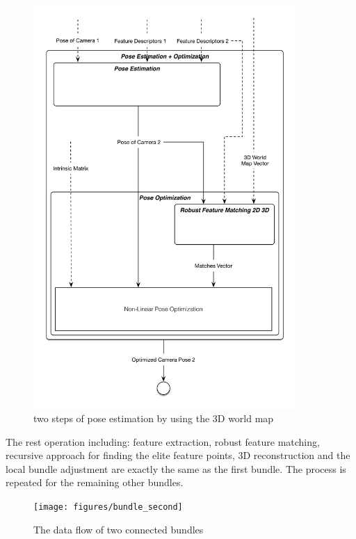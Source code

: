 \begin{figure}[H]
  \centering
  \includegraphics[width=100mm]{figures/pose_estimation_optimization}
  \caption{two steps of pose estimation by using the 3D world map}\label{fig:pose_estimation_optimization}
\end{figure}

The rest operation including: feature extraction, robust feature matching, recursive approach for finding the elite feature points, 3D reconstruction and the local bundle adjustment are exactly the same as the first bundle. The process is repeated for the remaining other bundles. 

\begin{figure}[H]
  \centering
  \texttt{[image: figures/bundle\_second]}
  \caption{The data flow of two connected bundles}\label{fig:bundle_second}
\end{figure}

